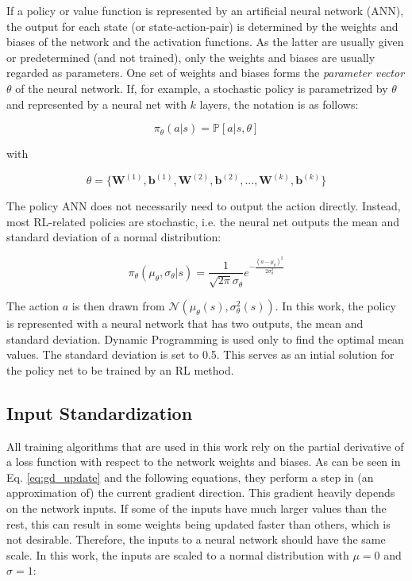 If a policy or value function is represented by an artificial neural network (ANN), the output for each state (or state-action-pair) is determined by the weights and biases of the network and the activation functions. As the latter are usually given or predetermined (and not trained), only the weights and biases are usually regarded as parameters. One set of weights and biases forms the \textit{parameter vector} $\theta$ of the neural network. If, for example, a stochastic policy is parametrized by $\theta$ and represented by a neural net with $k$ layers, the notation is as follows:

\begin{equation}
\pi_\theta(a|s)=\mathbb{P}[a|s,\theta]
\end{equation}

with

\begin{equation}
\theta = \{\boldsymbol{W}^{(1)},\boldsymbol{b}^{(1)},\boldsymbol{W}^{(2)},\boldsymbol{b}^{(2)}, ...,
\boldsymbol{W}^{(k)},\boldsymbol{b}^{(k)}\}
\label{eq:theta}
\end{equation}

The policy ANN does not necessarily need to output the action directly. Instead, most RL-related policies are stochastic, i.e. the neural net outputs the mean and standard deviation of a normal distribution:

\begin{equation}
\pi_\theta(\mu_\theta,\sigma_\theta|s)=\frac{1}{\sqrt{2\pi}\sigma_\theta}e^{-\frac{(a-\mu_\theta)^2}{2\sigma_\theta^2}}
\end{equation}

The action $a$ is then drawn from $\mathcal{N}(\mu_\theta(s),\sigma^2_\theta(s))$. 
In this work, the policy is represented with a neural network that has two outputs, the mean and standard deviation. Dynamic Programming is used only to find the optimal mean values. The standard deviation is set to 0.5. This serves as an intial solution for the policy net to be trained by an RL method.

\subsection*{Input Standardization}
\label{sec:input_standardization}
All training algorithms that are used in this work rely on the partial derivative of a loss function with respect to the network weights and biases. As can be seen in Eq. \ref{eq:gd_update} and the following equations, they perform a step in (an approximation of) the current gradient direction. This gradient heavily depends on the network inputs. If some of the inputs have much larger values than the rest, this can result in some weights being updated faster than others, which is not desirable. Therefore, the inputs to a neural network should have the same scale. In this work, the inputs are scaled to a normal distribution with $\mu = 0$ and $\sigma = 1$:


